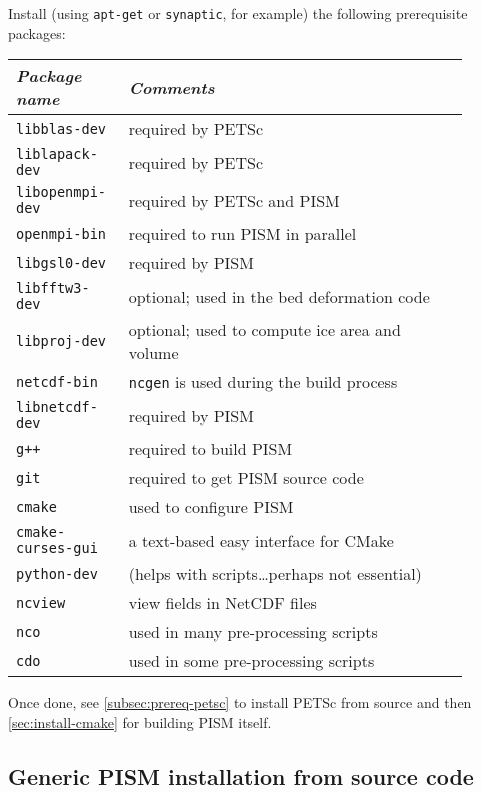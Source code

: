 \documentclass[titlepage,letterpaper,final]{scrartcl}
\begin{document}
Install (using \texttt{apt-get} or \texttt{synaptic}, for example) the following
prerequisite packages:
\begin{center}
  \begin{tabular*}{0.9\linewidth}{p{0.2\linewidth}p{0.7\linewidth}}
    \toprule
    \emph{Package name} & \emph{Comments}\\
    \midrule
    \texttt{libblas-dev} & required by PETSc\\
    \texttt{liblapack-dev} & required by PETSc \\
    \texttt{libopenmpi-dev} & required by PETSc and PISM \\
    \texttt{openmpi-bin} & required to run PISM in parallel \\
    \texttt{libgsl0-dev} & required by PISM\\
    \texttt{libfftw3-dev} & optional; used in the bed deformation code\\
    \texttt{libproj-dev} & optional; used to compute ice area and volume \\
    \texttt{netcdf-bin} & \texttt{ncgen} is used during the build process \\
    \texttt{libnetcdf-dev} & required by PISM \\
    \texttt{g++} & required to build PISM \\
    \texttt{git} & required to get PISM source code \\
    \texttt{cmake} & used to configure PISM \\
    \texttt{cmake-curses-gui} & a text-based easy interface for CMake \\
    \texttt{python-dev} & (helps with scripts\dots perhaps not essential) \\
    \texttt{ncview} & view fields in NetCDF files \\
    \texttt{nco} & used in many pre-processing scripts \\
    \texttt{cdo} & used in some pre-processing scripts \\
    \bottomrule
  \end{tabular*}
\end{center}

Once done, see \ref{subsec:prereq-petsc} to install PETSc from source and then
\ref{sec:install-cmake} for building PISM itself.

\vspace{0.3in}


\subsection{Generic PISM installation from source code}\label{subsec:generic}
\end{document}
